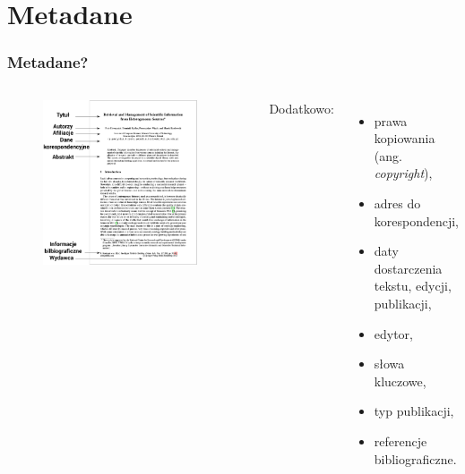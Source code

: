 \documentclass[11pt,t]{beamer}
\begin{document}
\section{Metadane}
\begin{frame}
\frametitle{Metadane?}
\begin{columns}
\begin{figure}[ht!]
\includegraphics[width=0.9\textwidth]{art_meta.png}
\end{figure}
Dodatkowo:\\
\begin{itemize}
\item prawa kopiowania (ang. \textit{copyright}),
\item adres do korespondencji,
\item daty dostarczenia tekstu, edycji, publikacji,
\item edytor,
\item słowa kluczowe,
\item typ publikacji,
\item referencje bibliograficzne.
\end{itemize}
\end{columns}
\end{frame}
\end{document}
